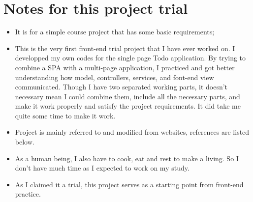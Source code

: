 \documentclass[9pt,b5paper]{article}
\begin{document}
\section{Notes for this project trial}
\label{sec-14}
\begin{itemize}
\item It is for a simple course project that has some basic requirements;
\item This is the very first front-end trial project that I have ever worked on. I developped my own codes for the single page Todo application. By trying to combine a SPA with a multi-page application, I practiced and got better understanding how model, controllers, services, and font-end view communicated. Though I have two separated working parts, it doesn't necessary mean I could combine them, include all the necessary parts, and make it work properly and satisfy the project requirements. It did take me quite some time to make it work.
\item Project is mainly referred to and modified from websites, references are listed below.
\item As a human being, I also have to cook, eat and rest to make a living. So I don't have much time as I expected to work on my study.
\item As I claimed it a trial, this project serves as a starting point from front-end practice.
\end{itemize}
\end{document}
